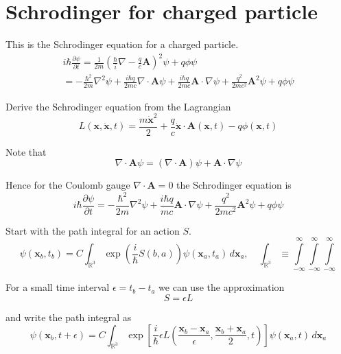 

\section*{Schrodinger for charged particle}

This is the Schrodinger equation for a charged particle.
\begin{multline*}
i\hbar\frac{\partial\psi}{\partial t}
=\frac{1}{2m}\left(\frac{\hbar}{i}\nabla-\frac{q}{c}\mathbf A\right)^2\psi+q\phi\psi
\\
=-\frac{\hbar^2}{2m}\nabla^2\psi
+\frac{i\hbar q}{2mc}\nabla\cdot\mathbf A\psi
+\frac{i\hbar q}{2mc}\mathbf A\cdot\nabla\psi
+\frac{q^2}{2mc^2}\mathbf A^2\psi
+q\phi\psi
\end{multline*}

Derive the Schrodinger equation from the Lagrangian
\begin{equation*}
L(\mathbf x,\dot{\mathbf x},t)=\frac{m\dot{\mathbf x}^2}{2}
+\frac{q}{c}\dot{\mathbf x}\cdot\mathbf A(\mathbf x,t)-q\phi(\mathbf x,t)
\end{equation*}

Note that
\begin{equation*}
\nabla\cdot\mathbf A\psi=(\nabla\cdot\mathbf A)\psi+\mathbf A\cdot\nabla\psi
\end{equation*}

Hence for the Coulomb gauge $\nabla\cdot\mathbf A=0$ the Schrodinger equation is
\begin{equation*}
i\hbar\frac{\partial\psi}{\partial t}
=-\frac{\hbar^2}{2m}\nabla^2\psi
+\frac{i\hbar q}{mc}\mathbf A\cdot\nabla\psi
+\frac{q^2}{2mc^2}\mathbf A^2\psi
+q\phi\psi
\tag{1}
\end{equation*}

Start with the path integral for an action $S$.
\begin{equation*}
\psi(\mathbf x_b,t_b)
=C\int_{\mathbb R^3}\exp\left(\frac{i}{\hbar}S(b,a)\right)
\psi(\mathbf x_a,t_a)\,d\mathbf x_a,\quad
\int_{\mathbb R^3}\equiv\int\limits_{-\infty}^\infty\int\limits_{-\infty}^\infty\int\limits_{-\infty}^\infty
\end{equation*}

For a small time interval $\epsilon=t_b-t_a$ we can use the approximation
\begin{equation*}
S=\epsilon L
\end{equation*}

and write the path integral as
\begin{equation*}
\psi(\mathbf x_b,t+\epsilon)=C\int_{\mathbb R^3}
\exp\left[\frac{i}{\hbar}
\epsilon L\left(\frac{\mathbf x_b-\mathbf x_a}{\epsilon},\frac{\mathbf x_b+\mathbf x_a}{2},t\right)
\right]
\psi(\mathbf x_a,t)\,d\mathbf x_a
\end{equation*}

